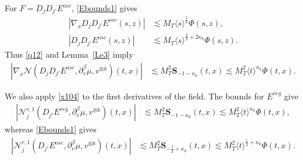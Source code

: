 \documentclass[reqno,11pt]{amsart}
\numberwithin{equation}{section}
\begin{document}
For $F=D_jD_{j'}E^{osc}$, \eqref{Ebounds1} gives
\begin{align*}
|\nabla_xD_jD_{j'}E^{osc}(s,z)|
&\lesssim M_T\langle s\rangle^{\frac16}\Phi(s,z),\\
|D_jD_{j'}E^{osc}(s,z)|
&\lesssim M_T\langle s\rangle^{\frac23+2\kappa_0}\Phi(s,z).
\end{align*}
Thus \eqref{q12} and Lemma~\ref{Le3} imply
\begin{align}
\left|\nabla_x\mathcal N
(D_jD_{j'}E^{osc},\partial_v^\beta\mu,v^{\otimes k})(t,x)\right|
&\lesssim M_T^2\mathbf S_{-1-\kappa_0}(t,x)\lesssim
M_T^2\langle t\rangle^{\kappa_0}\Phi(t,x).
\label{q13}
\end{align}

We also apply \eqref{x104} to the first derivatives of
the field. The bounds for $E^{reg}$ give
\begin{align}
\left|\mathcal N_j^{r,1}
(D_{j'}E^{reg},\partial_v^\beta\mu,v^{\otimes k})(t,x)\right|
&\lesssim M_T^2\mathbf S_{-1-\kappa_0}(t,x)\lesssim
M_T^2\langle t\rangle^{\kappa_0}\Phi(t,x),
\label{q25}
\end{align}
whereas \eqref{Ebounds1} gives
\begin{align}
\left|\mathcal N_j^{r,1}
(D_{j'}E^{osc},\partial_v^\beta\mu,v^{\otimes k})(t,x)\right|
&\lesssim M_T^2\mathbf S_{-\frac12+\kappa_0}(t,x)\lesssim
M_T^2\langle t\rangle^{\frac12+\kappa_0}\Phi(t,x).
\label{q26}
\end{align}
\end{document}
